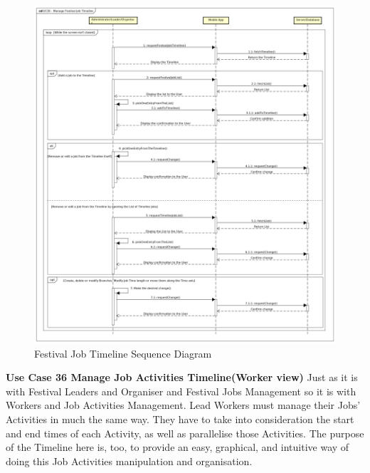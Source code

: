 				\begin{figure}[H]
					\includegraphics[width=\linewidth]{diagrams/sd-diag1-fjt.png}
					\caption{Festival Job Timeline Sequence Diagram}
					\label{fig:sd1_festival_job_timeline}
				\end{figure}
				
				\textbf{Use Case 36 Manage Job Activities Timeline(Worker view)}
				Just as it is with Festival Leaders and Organiser and Festival Jobs Management so it is with Workers and Job Activities Management.
				Lead Workers must manage their Jobs' Activities in much the same way. They have to take into consideration the start and end times of each Activity, as well as parallelise those Activities.
				The purpose of the Timeline here is, too, to provide an easy, graphical, and intuitive way of doing this Job Activities manipulation and organisation.
				
